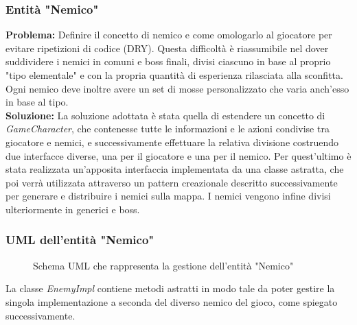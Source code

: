 \documentclass[a4paper,12pt]{report}
\begin{document}
\subsubsection{Entità "Nemico"}
\textbf{Problema:} Definire il concetto di nemico e come omologarlo al giocatore per evitare ripetizioni di codice (DRY).
Questa difficoltà è riassumibile nel dover suddividere i nemici in comuni e boss finali, divisi ciascuno in base al proprio "tipo elementale" e con la propria quantità di esperienza rilasciata alla sconfitta. Ogni nemico deve inoltre avere un set di mosse personalizzato che varia anch'esso in base al tipo.\\
\textbf{Soluzione:} La soluzione adottata è stata quella di estendere un concetto di \textit{GameCharacter}, che contenesse tutte le informazioni e le azioni condivise tra giocatore e nemici, e successivamente effettuare la relativa divisione costruendo due interfacce diverse, una per il giocatore e una per il nemico. Per quest'ultimo è stata realizzata un'apposita interfaccia implementata da una classe astratta, che poi verrà utilizzata attraverso un pattern creazionale descritto successivamente per generare e distribuire i nemici sulla mappa. I nemici vengono infine divisi ulteriormente in generici e boss.
\subsubsection{UML dell'entità "Nemico"}
\begin{figure}[H]
	\centering
	
	\caption{Schema UML che rappresenta la gestione dell'entità "Nemico"} 
	\label{fig:Schema UML dell'entità nemico}
\end{figure}
La classe \textit{EnemyImpl} contiene metodi astratti in modo tale da poter gestire la singola implementazione a seconda del diverso nemico del gioco, come spiegato successivamente.
\end{document}
